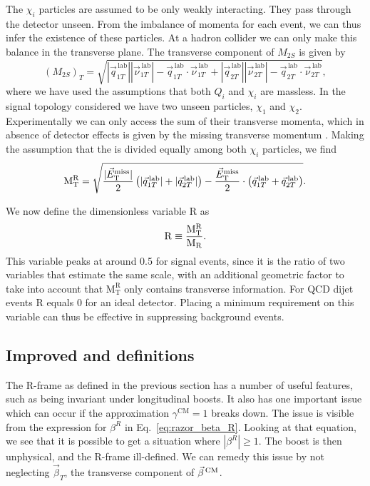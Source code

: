 The $\chi_i$ particles are assumed to be only weakly interacting. They pass through the detector
unseen. From the imbalance of momenta for each event, we can thus infer the existence of
these particles. At a hadron collider we can only make this balance in the transverse plane. The
transverse component of $M_{2S}$ is given by
\begin{equation}
  (M_{2S})_T = \sqrt{ |\vec{q}^{\,\textrm{lab}}_{1T}| |\vec{\nu}^{\,\textrm{lab}}_{1T}| -
\vec{q}^{\,\textrm{lab}}_{1T} \cdot \vec{\nu}^{\,\textrm{lab}}_{1T} 
                  + |\vec{q}^{\,\textrm{lab}}_{2T}| |\vec{\nu}^{\,\textrm{lab}}_{2T}| -
\vec{q}^{\,\textrm{lab}}_{2T} \cdot \vec{\nu}^{\,\textrm{lab}}_{2T}} ,
\end{equation}
where we have used the assumptions that both $Q_i$ and $\chi_i$ are massless. 
In the signal topology considered we have two unseen particles, $\chi_1$ and $\chi_2$.
Experimentally we can only access the sum of their transverse momenta, which in absence of detector
effects is given by the missing transverse momentum \VEtmiss. Making the assumption that the
\VEtmiss is divided equally among both $\chi_i$ particles, we find
\begin{equation}
  \mathrm{M_T^R} = \sqrt{\frac{|{\vec E}_{\mathrm{T}}^{\text{miss}}|}{2} \left(|\vec{q}^{\,\textrm{lab}}_{1T}| +
|\vec{q}^{\,\textrm{lab}}_{2T}| \right) - \frac{{\vec E}_{\mathrm{T}}^{\text{miss}}}{2} \cdot
\left(\vec{q}^{\,\textrm{lab}}_{1T} + \vec{q}^{\,\textrm{lab}}_{2T} \right)} .
\end{equation}

We now define the dimensionless variable $\mathrm{R}$ as
\begin{equation}
  \mathrm{R} \equiv \frac{\mathrm{M_T^R}}{\mathrm{M_R}} .
\end{equation}
This variable peaks at around 0.5 for signal events, since it is the ratio of two variables that
estimate the same scale, with an additional geometric factor to take into account that
$\mathrm{M_T^R}$ only contains transverse information. For QCD dijet events $\mathrm{R}$ equals 0
for an ideal detector. Placing a minimum requirement on this variable can thus be effective in
suppressing background events.


\subsection{Improved \texorpdfstring{\mr and \rsq}{MR and R2} definitions
\label{sec:razor_mr_r2_improved}}

The R-frame as defined in the previous section has a number of useful features, such as \mr
being invariant under longitudinal boosts. It also has one important issue which can occur if the
approximation $\gamma^{\textrm{CM}} = 1$ breaks down. The issue is visible from the expression for
$\beta^R$ in Eq.~\ref{eq:razor_beta_R}. Looking at that equation, we see that it is possible to get
a situation where $|\beta^R| \geq 1$. The boost is then unphysical, and the R-frame ill-defined.
We can remedy this issue by not neglecting $\vec{\beta}_T$, the transverse component of
$\vec{\beta}^{\,\textrm{CM}}$. 

